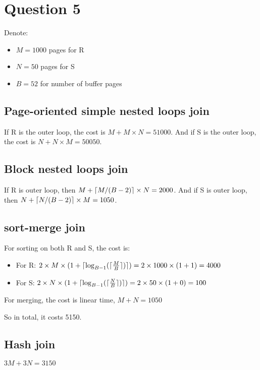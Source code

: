 \section{Question 5}\label{question-5}

Denote:

\begin{itemize}
\tightlist
\item
  $M=1000$ pages for R
\item
  $N=50$ pages for S
\item
  $B=52$ for number of buffer pages
\end{itemize}

\subsection{Page-oriented simple nested loops join}\label{page-oriented-simple-nested-loops-join}

If R is the outer loop, the cost is $M + M \times N = 51000$. 
And if S is the outer loop, the cost is $N + N \times M = 50050$. 

\subsection{Block nested loops join}\label{block-nested-loops-join}

If R is outer loop, then $M + \lceil M / (B-2)\rceil \times N = 2000$. 
And if S is outer loop, then $N + \lceil N / (B-2)\rceil \times M = 1050$. 

\subsection{sort-merge join}\label{sort-merge-join}

For sorting on both R and S, the cost is:

\begin{itemize}
\tightlist
\item
  For R: $2 \times M \times (1 + \lceil\log_{B-1}(\lceil\frac{M}{B}\rceil)\rceil) = 2 \times 1000 \times (1 + 1) = 4000$
\item
  For S: $2 \times N \times (1 + \lceil\log_{B-1}(\lceil\frac{N}{B}\rceil)\rceil) = 2 \times 50 \times (1 + 0) = 100$
\end{itemize}

For merging, the cost is linear time, $M + N = 1050$

So in total, it costs 5150. 

\subsection{Hash join}\label{hash-join}

$3M+3N = 3150$

